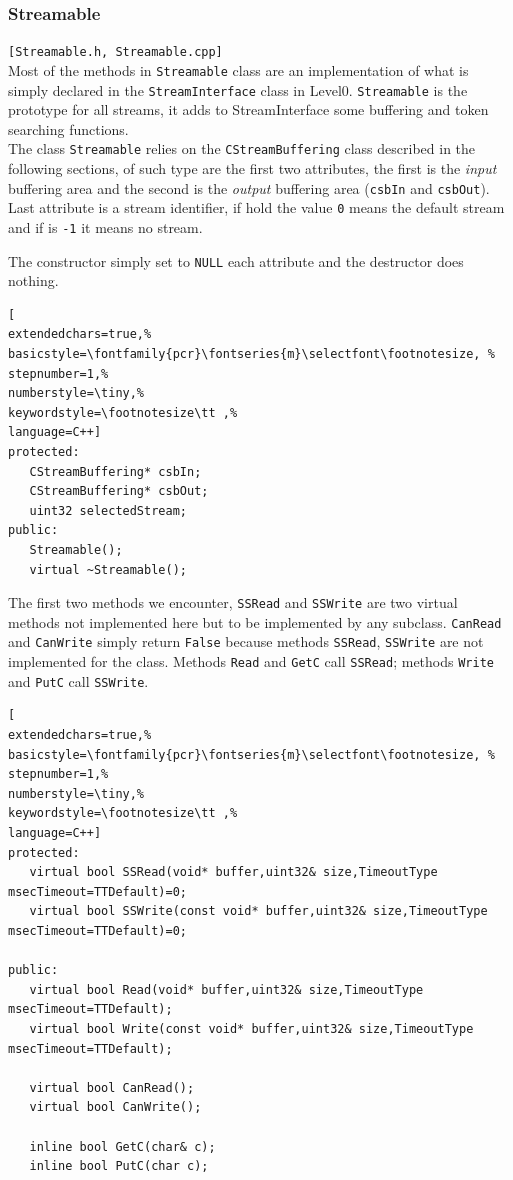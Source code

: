 \subsubsection{Streamable}
\texttt{[Streamable.h, Streamable.cpp]}\\
Most of the methods in \texttt{Streamable} class are an implementation of what is simply declared in the \texttt{StreamInterface} class in Level0. \texttt{Streamable} is the prototype for all streams, it adds to StreamInterface some buffering and token searching functions.\\


The class \texttt{Streamable} relies on the \texttt{CStreamBuffering} class described in the following sections, of such type are the first two attributes, the first is the \textit{input} buffering area and the second is the \textit{output} buffering area (\texttt{csbIn} and \texttt{csbOut}). Last attribute is a stream identifier, if hold the value \texttt{0} means the default stream and if is \texttt{-1} it means no stream.

The constructor simply set to \texttt{NULL} each attribute and the destructor does nothing.
\begin{lstlisting}[
extendedchars=true,%
basicstyle=\fontfamily{pcr}\fontseries{m}\selectfont\footnotesize, %
stepnumber=1,%
numberstyle=\tiny,%
keywordstyle=\footnotesize\tt ,%
language=C++]
protected:
   CStreamBuffering* csbIn;
   CStreamBuffering* csbOut;
   uint32 selectedStream;
public:
   Streamable();
   virtual ~Streamable();
\end{lstlisting}

The first two methods we encounter, \texttt{SSRead} and \texttt{SSWrite} are two virtual methods not implemented here but to be implemented by any subclass. \texttt{CanRead} and \texttt{CanWrite} simply return \texttt{False} because methods \texttt{SSRead}, \texttt{SSWrite} are not implemented for the class. Methods \texttt{Read} and \texttt{GetC} call \texttt{SSRead}; methods \texttt{Write} and \texttt{PutC} call \texttt{SSWrite}.
\begin{lstlisting}[
extendedchars=true,%
basicstyle=\fontfamily{pcr}\fontseries{m}\selectfont\footnotesize, %
stepnumber=1,%
numberstyle=\tiny,%
keywordstyle=\footnotesize\tt ,%
language=C++]
protected:
   virtual bool SSRead(void* buffer,uint32& size,TimeoutType msecTimeout=TTDefault)=0;
   virtual bool SSWrite(const void* buffer,uint32& size,TimeoutType msecTimeout=TTDefault)=0;

public:
   virtual bool Read(void* buffer,uint32& size,TimeoutType msecTimeout=TTDefault);
   virtual bool Write(const void* buffer,uint32& size,TimeoutType msecTimeout=TTDefault);

   virtual bool CanRead();
   virtual bool CanWrite();

   inline bool GetC(char& c);
   inline bool PutC(char c);
\end{lstlisting}

